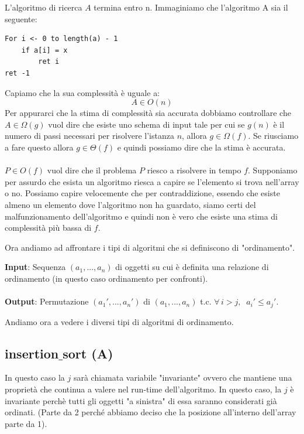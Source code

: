 \documentclass[a4paper]{article}
\begin{document}
L'algoritmo di ricerca $A$ termina entro n. Immaginiamo che l'algoritmo A sia il seguente:
\begin{lstlisting}
For i <- 0 to length(a) - 1
    if a[i] = x
        ret i
ret -1
\end{lstlisting}
Capiamo che la sua complessità è uguale a:
\[A \in O(n)\]
Per appurarci che la stima di complessità sia accurata dobbiamo controllare che $A \in \Omega(g)$ vuol dire che esiste uno schema di input tale per cui se $g(n)$ è il numero di passi necessari per risolvere l'istanza $n$, allora $g \in \Omega(f)$. Se riusciamo a fare questo allora $g \in \Theta(f)$ e quindi possiamo dire che la stima è accurata.
\\\\
$P \in O(f)$ vuol dire che il problema $P$ riesco a risolvere in tempo $f$. Supponiamo per assurdo che esista un algoritmo riesca a capire se l'elemento si trova nell'array o no. Possiamo capire velocemente che per contraddizione, essendo che esiste almeno un elemento dove l'algoritmo non ha guardato, siamo certi del malfunzionamento dell'algoritmo e quindi non è vero che esiste una stima di complessità più bassa di $f$.


Ora andiamo ad affrontare i tipi di algoritmi che si definiscono di "ordinamento". 
\begin{definition}
\textbf{Input}: Sequenza $(a_1, ..., a_n)$ di oggetti su cui è definita una relazione di ordinamento (in questo caso ordinamento per confronti).
\\\\
\textbf{Output}: Permutazione $(a_1', ..., a_n')$ di $(a_1, ..., a_n)$ t.c. $\forall \, i > j, \; \; a_i' \le a_j'$.
\end{definition}
Andiamo ora a vedere i diversi tipi di algoritmi di ordinamento.

\subsection{insertion$\_$sort (A)}

In questo caso la $j$ sarà chiamata variabile "invariante" ovvero che mantiene una proprietà che continua a valere nel run-time dell'algoritmo. In questo caso, la $j$ è invariante perchè tutti gli oggetti "a sinistra" di essa saranno considerati già ordinati. (Parte da 2 perché abbiamo deciso che la posizione all'interno dell'array parte da 1).
\end{document}
